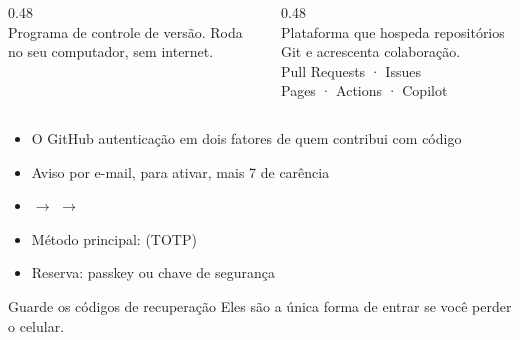 \begin{frame}{}
  \vspace{1em}
  \begin{columns}[T]
    \begin{column}{0.48\textwidth}
      \\[.4em]
      {\lexendlight Programa de controle de versão. Roda no seu computador,
      sem internet.}\\[.6em]
      \\ \\ 
    \end{column}
    \begin{column}{0.48\textwidth}
      \\[.4em]
      {\lexendlight Plataforma que hospeda repositórios Git e acrescenta
      colaboração.}\\[.6em]
      Pull Requests · Issues\\ Pages · Actions · Copilot
    \end{column}
  \end{columns}

  \vspace{1.5em}
  \begin{center}
  \end{center}

\end{frame}

\begin{frame}{}
  \vspace{0.6em}
  \begin{itemize}
    \item O GitHub  autenticação em dois fatores de quem contribui com código
    \item Aviso por e-mail,  para ativar, mais 7 de carência
    \item {} \(\rightarrow\)  \(\rightarrow\) 
    \item Método principal:  (TOTP)
    \item Reserva: passkey ou chave de segurança
  \end{itemize}

  \vspace{1em}
  \begin{alertblock}{Guarde os códigos de recuperação}
    Eles são a única forma de entrar se você perder o celular.
  \end{alertblock}

\end{frame}

